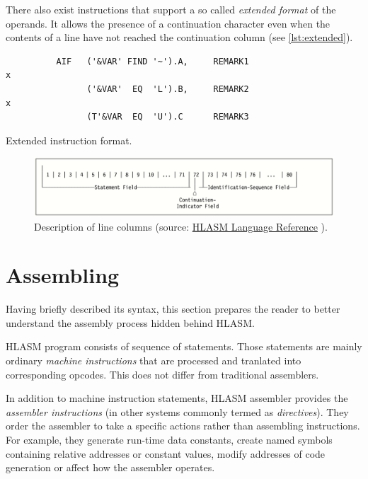 There also exist instructions that support a so called \emph{extended format} of the operands. It allows the presence of a continuation character even when the contents of a line have not reached the continuation column (see \cref{lst:extended}).

\begin{listing}
\begin{verbatim}
          AIF   ('&VAR' FIND '~').A,     REMARK1                        x
                ('&VAR'  EQ  'L').B,     REMARK2                        x
                (T'&VAR  EQ  'U').C      REMARK3 
\end{verbatim}
\caption{Extended instruction format.}
\label{lst:extended}
\end{listing}

\begin{figure}
	\includegraphics[width=\textwidth]{img/line}
	\caption{Description of line columns (source: \href{https://www-01.ibm.com/servers/resourcelink/svc00100.nsf/pages/zOSV2R3sc264940/$file/asmr1023.pdf}{HLASM Language Reference} ).}
	\label{fig01:line}
\end{figure}


\section{Assembling}

Having briefly described its syntax, this section prepares the reader to better understand the assembly process hidden behind HLASM. 

HLASM program consists of sequence of statements. Those statements are mainly ordinary \emph{machine instructions} that are processed and tranlated into corresponding opcodes. This does not differ from traditional assemblers.

In addition to machine instruction statements, HLASM assembler provides the \emph{assembler instructions} (in other systems commonly termed as \emph{directives}). They order the assembler to take a specific actions rather than assembling instructions. For example, they generate run-time data constants, create named symbols containing relative addresses or constant values, modify addresses of code generation or affect how the assembler operates.

